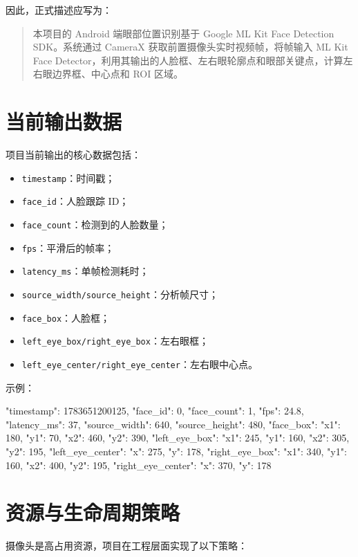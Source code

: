 \documentclass[UTF8,a4paper,11pt]{ctexart}
\begin{document}
因此，正式描述应写为：

\begin{quote}
本项目的 Android 端眼部位置识别基于 Google ML Kit Face Detection SDK。系统通过 CameraX 获取前置摄像头实时视频帧，将帧输入 ML Kit Face Detector，利用其输出的人脸框、左右眼轮廓点和眼部关键点，计算左右眼边界框、中心点和 ROI 区域。
\end{quote}

\section{当前输出数据}

项目当前输出的核心数据包括：

\begin{itemize}
  \item \texttt{timestamp}：时间戳；
  \item \texttt{face\_id}：人脸跟踪 ID；
  \item \texttt{face\_count}：检测到的人脸数量；
  \item \texttt{fps}：平滑后的帧率；
  \item \texttt{latency\_ms}：单帧检测耗时；
  \item \texttt{source\_width/source\_height}：分析帧尺寸；
  \item \texttt{face\_box}：人脸框；
  \item \texttt{left\_eye\_box/right\_eye\_box}：左右眼框；
  \item \texttt{left\_eye\_center/right\_eye\_center}：左右眼中心点。
\end{itemize}

示例：

\begin{code}
{
  "timestamp": 1783651200125,
  "face_id": 0,
  "face_count": 1,
  "fps": 24.8,
  "latency_ms": 37,
  "source_width": 640,
  "source_height": 480,
  "face_box": {"x1": 180, "y1": 70, "x2": 460, "y2": 390},
  "left_eye_box": {"x1": 245, "y1": 160, "x2": 305, "y2": 195},
  "left_eye_center": {"x": 275, "y": 178},
  "right_eye_box": {"x1": 340, "y1": 160, "x2": 400, "y2": 195},
  "right_eye_center": {"x": 370, "y": 178}
}
\end{code}

\section{资源与生命周期策略}

摄像头是高占用资源，项目在工程层面实现了以下策略：
\end{document}
